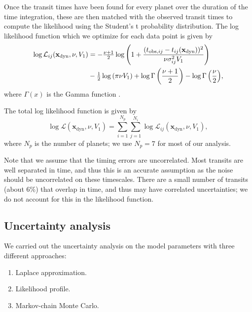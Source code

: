 \documentclass[fleqn,usenatbib]{mnras} %
\begin{document}
Once the transit times have been found for every planet over the
duration of the time integration, these are then matched with the observed
transit times to compute the likelihood using the Student's t
probability distribution.  
The log likelihood function which we
optimize for each data point is given by
\begin{equation}
\begin{split}
\log{\mathcal{L}_{ij}}(\mathbf{x}_\mathrm{dyn},\nu,V_1) &= -\tfrac{\nu+1}{2}\log\left(1+\frac{(t_{\mathrm{obs},ij}-t_{ij}(\mathbf{x}_\mathrm{dyn}))^2}{\nu \sigma_{ij}^2 V_1}\right) \\
&-\tfrac{1}{2} \log{\left(\pi \nu V_1\right)} + \log{\Gamma\left(\frac{\nu+1}{2}\right)} - \log{\Gamma\left(\frac{\nu}{2}\right)},\cr
\end{split}
\end{equation}
where $\Gamma(x)$ is the Gamma function \citep{Fisher1925}.

The total log likelihood function is given by
\begin{equation}
    \log{\mathcal{L}}(\mathbf{x}_\mathrm{dyn},\nu,V_1) = \sum_{i=1}^{N_p} \sum_{j=1}^{N_i} \log{\mathcal{L}_{ij}}(\mathbf{x}_\mathrm{dyn},\nu,V_1),
\end{equation}
where $N_p$ is the number of planets; we use $N_p = 7$ for most of our analysis.

Note that we assume that the timing errors are uncorrelated.  Most transits
are well separated in time, and thus this is an accurate assumption as the noise
should be uncorrelated on these timescales.  There are a small number of transits
(about 6\%) that overlap in time, and thus may have correlated uncertainties; we do not account for this in the likelihood function.

\subsection{Uncertainty analysis}

We carried out the uncertainty analysis on the model parameters with
three different approaches:

\begin{enumerate}
    \item Laplace approximation.
    \item Likelihood profile.
    \item Markov-chain Monte Carlo.
\end{enumerate}
\end{document}
